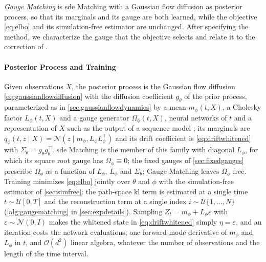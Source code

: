 \documentclass{article} %
\newcommand{\vol}{g}
\newcommand{\obs}{X}
\newcommand{\gauge}{\Omega}
\newcommand{\Norm}{\mathcal{N}}
\begin{document}
\emph{Gauge Matching} is \gls{sde} Matching with a Gaussian flow diffusion as posterior process, so that its marginals and its gauge are both learned, while the objective \cref{eq:elbo} and its simulation-free estimator are unchanged. After specifying the method, we characterize the gauge that the objective selects and relate it to the correction of \citet{smith2026closing}.

\paragraph{Posterior Process and Training}
Given observations $\obs$, the posterior process is the Gaussian flow diffusion \cref{eq:gaussianflowdiffusion} with the diffusion coefficient $\vol_\theta$ of the prior process, parameterized as in \cref{sec:gaussianflowdynamics} by a mean $m_\phi(t, \obs)$, a Cholesky factor $L_\phi(t, \obs)$ and a gauge generator $\gauge_\phi(t, \obs)$, neural networks of $t$ and a representation of $\obs$ such as the output of a sequence model \citep{bartosh2025sde}; its marginals are $q_\phi(t, z \mid \obs) = \Norm(z \mid m_\phi, L_\phi L_\phi^\top)$ and its drift coefficient is \cref{eq:driftwhitened} with $\Sigma_\theta = \vol_\theta \vol_\theta^\top$. \gls{sde} Matching is the member of this family with diagonal $L_\phi$, for which its square root gauge has $\gauge_\phi \equiv 0$; the fixed gauges of \cref{sec:fixedgauges} prescribe $\gauge_\phi$ as a function of $L_\phi$, $\dot L_\phi$ and $\Sigma_\theta$; Gauge Matching leaves $\gauge_\phi$ free. Training minimizes \cref{eq:elbo} jointly over $\theta$ and $\phi$ with the simulation-free estimator of \cref{sec:simfree}: the path-space \gls{kl} term is estimated at a single time $t \sim \mathcal{U}[0, T]$ and the reconstruction term at a single index $i \sim \mathcal{U}\{1, \ldots, N\}$ (\cref{alg:gaugematching} in \cref{sec:expdetails}). Sampling $Z_t = m_\phi + L_\phi \varepsilon$ with $\varepsilon \sim \Norm(0, I)$ makes the whitened state in \cref{eq:driftwhitened} simply $\eta = \varepsilon$, and an iteration costs the network evaluations, one forward-mode derivative of $m_\phi$ and $L_\phi$ in $t$, and $\mathcal{O}(d^2)$ linear algebra, whatever the number of observations and the length of the time interval.
\end{document}
